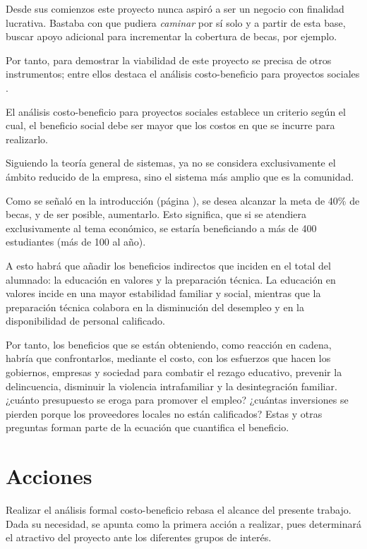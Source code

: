Desde sus comienzos este proyecto nunca aspiró a ser un negocio
con finalidad lucrativa.
Bastaba con que pudiera \emph{caminar} por sí solo y a partir de esta base, buscar apoyo adicional para incrementar la cobertura de becas, por ejemplo.

Por tanto, para demostrar la viabilidad de este proyecto se precisa de otros instrumentos; entre ellos destaca el análisis costo-beneficio para proyectos sociales \citep{Conant2004}.

El análisis costo-beneficio para proyectos sociales establece un criterio según el cual, el beneficio social debe ser mayor que los costos en que se incurre para realizarlo.

Siguiendo la teoría general de sistemas, ya no se considera exclusivamente el ámbito reducido de la empresa, sino el sistema más amplio que es la comunidad.

Como se señaló en la introducción (página \pageref{sub:sub:Beneficio:Social}), se desea alcanzar la meta de 40\% de becas, y de ser posible, aumentarlo. Esto significa, que si se atendiera exclusivamente al tema económico, se estaría beneficiando a más de 400 estudiantes (más de 100 al año).

A esto habrá que añadir los beneficios indirectos que inciden en el total del alumnado: la educación en valores y la preparación técnica. La educación en valores incide en una mayor estabilidad familiar y social, mientras que la preparación técnica colabora en la disminución del desempleo y en la disponibilidad de personal calificado.

Por tanto, los beneficios que se están obteniendo, como reacción en cadena, habría que confrontarlos, mediante el costo, con los esfuerzos que hacen los gobiernos, empresas y sociedad para combatir el rezago educativo, prevenir la delincuencia, disminuir la violencia intrafamiliar y la desintegración familiar. ¿cuánto presupuesto se eroga para promover el empleo? ¿cuántas inversiones se pierden porque los proveedores locales no están calificados? Estas y otras preguntas forman parte de la ecuación que cuantifica el beneficio.

\section*{Acciones}

Realizar el análisis formal costo-beneficio rebasa el alcance del presente trabajo. Dada su necesidad, se apunta como la primera acción a realizar, pues determinará el atractivo del proyecto ante los diferentes grupos de interés.

